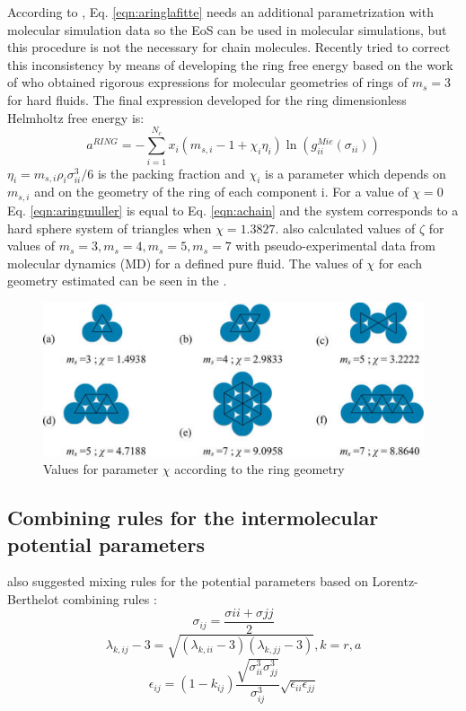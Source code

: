 According to , Eq. \eqref{eqn:aringlafitte} needs an additional parametrization with molecular simulation data so the EoS can  be used in molecular simulations, but this procedure is not the necessary for chain molecules. Recently  tried to correct this inconsistency by means of developing the ring free energy based on the work of  who obtained rigorous expressions for molecular geometries of rings of $m_s=3$ for hard fluids. The final expression developed for the ring dimensionless Helmholtz free energy is:
\begin{equation}
a^{RING} =-\sum_{i=1}^{N_{c}} x_{i}(m_{s,i}-1+\chi_{i}\eta_{i})\ln(g_{ii}^{Mie}(\sigma_{ii}))
\label{eqn:aringmuller}
\end{equation}
$\eta_{i}=m_{s,i}\rho_{i}\sigma_{ii}^{3}/6$ is the packing fraction and $\chi_{i}$ is a parameter which depends on $m_{s,i}$ and on the geometry of the ring of each component i. For a value of $\chi=0$ Eq. \eqref{eqn:aringmuller} is equal to Eq. \eqref{eqn:achain} and the system corresponds to a hard sphere system of triangles when $\chi=1.3827$.  also calculated values of $\zeta$ for values of $m_{s}=3,m_{s}=4,m_{s}=5,m_{s}=7$ with pseudo-experimental data from molecular dynamics (MD) for a defined pure fluid. The values of $\chi$ for each geometry estimated can be seen in the .
\begin{figure}[th]
\centering
\includegraphics[scale=0.8]{Figures/mullergeo.jpg}
\caption{Values for parameter $\chi$ according to the ring geometry \cite{muller2017}}
\label{ringqsi}
\end{figure}

\subsection{Combining rules for the intermolecular potential parameters}
 also suggested mixing rules for the potential parameters based on Lorentz-Berthelot combining rules \cite{rowlinson}:
\begin{equation}
\sigma_{ij} =\frac{\sigma{ii}+\sigma{jj}}{2}
\label{eqn:sigmamix}
\end{equation}
\begin{equation}
\lambda_{k,ij} -3 =\sqrt{(\lambda_{k,ii}-3)(\lambda_{k,jj}-3)} , k=r,a
\label{eqn:lambdamix}
\end{equation}
\begin{equation}
\epsilon_{ij} =(1-k_{ij})\frac{\sqrt{\sigma_{ii}^{3}\sigma_{jj}^{3}}}{\sigma_{ij}^{3}}\sqrt{\epsilon_{ii}\epsilon_{jj}}
\label{eqn:epsmix}
\end{equation}

